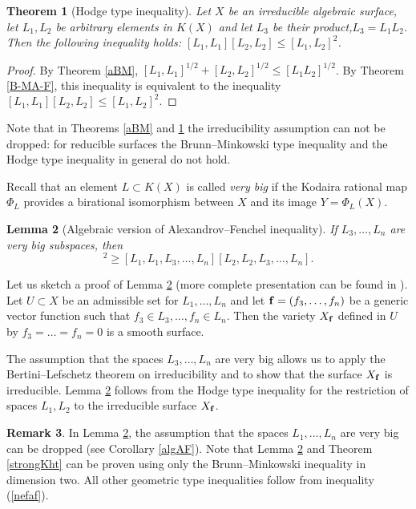 \documentclass[11pt]{article}
\theoremstyle{plain}
\newtheorem{theorem}{Theorem}[section]
\newtheorem{lemma}[theorem]{Lemma}
\theoremstyle{definition}
\newtheorem{remark}[theorem]{Remark}
\begin{document}
\begin{theorem}[Hodge type inequality]\label{hodge} Let $X$ be an irreducible  algebraic surface, let  $L_1, L_2 $ be arbitrary elements in $ K(X)$ and let $L_3$ be their product,$L_3 = L_1L_2$.  Then the following inequality holds:
$[L_1, L_1][L_2, L_2] \leq  [L_1, L_2]^2$.
\end{theorem}

\begin{proof} By Theorem \ref{aBM},   $[L_1,L_1]^{1/2}+[L_2,L_2]^{1/2}\leq [L_1L_2]^{1/2}$. By Theorem \ref{B-MA-F}, this inequality is equivalent to the inequality  $[L_1, L_1][L_2, L_2] \leq  [L_1,L_2]^2$.
\end{proof}

Note that in Theorems \ref{aBM} and  \ref{hodge}   the  irreducibility assumption can not be dropped:  for reducible surfaces the Brunn--Minkowski type inequality and the  Hodge type inequality in general do not hold.


Recall that an element $L\subset  K(X)$ is  called {\it very big} if  the Kodaira
rational map $\Phi_L $ provides  a birational isomorphism between $X$ and its image $Y=\Phi_L(X)$.

\begin{lemma}[Algebraic version of Alexandrov--Fenchel  inequality]\label{weakKht} If $L_3,\dots,L_n$ are very big  subspaces, then
\begin{equation*}[L_1, L_2, L_3,\dots, L_n]^2 \geq [L_1,L_1, L_3, \dots, L_n][L_2,L_2, L_3, \dots, L_n].\end{equation*}
\end{lemma}

Let us sketch a  proof of Lemma \ref{weakKht} (more complete presentation  can be found in  \cite{K-K12}).
Let $U\subset X$ be an admissible set for $L_1,\dots,L_n$ and let $\bold f=(f_3,\dots,f_n)$ be a generic vector function such that $f_3\in L_3,\dots, f_n\in L_n$. Then the variety $X_{\bold f}$ defined in $U$ by $f_3=\dots=f_n=0$ is a smooth surface.

The assumption that the spaces $L_3,\dots,L_n$ are very big allows us to apply  the  Bertini--Lefschetz theorem on irreducibility and to show that the surface $X_{\bold f}$ is irreducible. Lemma \ref{weakKht} follows from the Hodge type inequality for the restriction of spaces $L_1,L_2$ to  the  irreducible surface $X_{\bold f}$.


\begin{remark} In Lemma \ref{weakKht},   the assumption that the spaces $L_1,\dots,L_n$ are very big can be dropped (see Corollary \ref{algAF}). Note that Lemma \ref{weakKht} and Theorem \ref{strongKht} can be proven using only the Brunn--Minkowski inequality  in dimension two. All other geometric type inequalities follow from inequality (\ref{nefaf}).
\end{remark}
\end{document}
